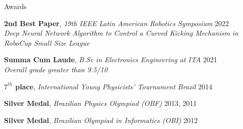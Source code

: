 \documentclass{resume} %
\begin{document}

\begin{rSection}{Awards} \itemsep -2pt
\vspace{-7pt}
\item \textbf{2nd Best Paper}, {\it 19th IEEE Latin American Robotics Symposium} \hfill 2022 \\ {\it Deep Neural Network Algorithm to Control a Curved Kicking Mechanism in RoboCup Small Size League}
\item \textbf{Summa Cum Laude}, {\it B.Sc in Electronics Engineering at ITA} \hfill 2021 \\ {\it Overall grade greater than 9.5/10}
\item \textbf{$7^{th}$ place}, {\it International Young Physicists' Tournament Brazil} \hfill 2014
\item {\bf Silver Medal}, {\it Brazilian Physics Olympiad (OBF)} \hfill 2013, 2011
\item {\bf Silver Medal}, {\it Brazilian Olympiad in Informatics (OBI)} \hfill 2012
\end{rSection}
\end{document}
